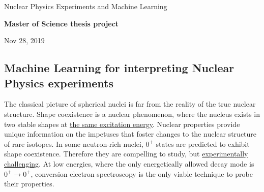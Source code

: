 \documentclass[%
oneside,                 %
final,                   %
10pt]{article}
\begin{document}

\newcommand{\exercisesection}[1]{\subsection*{#1}}






\thispagestyle{empty}

\begin{center}
{\LARGE\bf
\begin{spacing}{1.25}
Nuclear Physics Experiments and  Machine Learning
\end{spacing}
}
\end{center}


\begin{center}
{\bf Master of Science thesis project${}^{}$} \\ [0mm]
\end{center}

\begin{center}
\end{center}
    

\begin{center}
Nov 28, 2019
\end{center}

\vspace{1cm}


\subsection{Machine Learning for interpreting Nuclear Physics experiments}



The classical picture of spherical nuclei is far from the reality of the
true nuclear structure. Shape coexistence is a nuclear phenomenon, where
the nucleus exists in two stable shapes at \href{{https://www.europhysicsnews.org/articles/epn/pdf/2001/01/epn01101.pdf}}{the same excitation energy}.
Nuclear properties provide unique information on the impetuses that
foster changes to the nuclear structure of rare isotopes. In some
neutron-rich nuclei, $0^{+}$ states are predicted to exhibit shape
coexistence. Therefore they are compelling to study, but \href{{http://iopscience.iop.org/article/10.1088/0954-3899/43/2/024001}}{experimentally
challenging}.
At low energies, where the only energetically allowed decay mode is
$0^{+} \rightarrow 0^{+}$, conversion electron spectroscopy is the
only viable technique to probe their properties.
\end{document}
